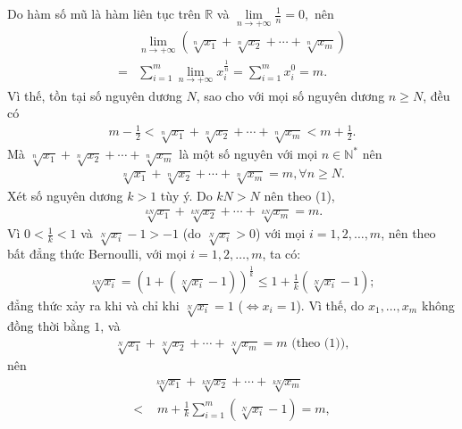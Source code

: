 \begin{multicols}{2}
	\vskip 0.05cm
	Do hàm số mũ là hàm liên tục trên $\mathbb{R}$ và  $\mathop {\lim }\limits_{n \to  + \infty } \frac{1}{n} = 0,$ nên
	\begin{align*}
		&\mathop {\lim }\limits_{n \to  + \infty } \left( {\sqrt[n]{{{x_1}}} + \sqrt[n]{{{x_2}}} +  \cdots  + \sqrt[n]{{{x_m}}}} \right) \\
		= &\sum\limits_{i = 1}^m {\mathop {\lim }\limits_{n \to  + \infty } x_i^{\frac{1}{n}}}  = \sum\limits_{i = 1}^m {x_i^0}  = m.
	\end{align*}
	Vì thế, tồn tại số nguyên dương $N$, sao cho với mọi số nguyên dương $n \ge N$, đều có
	\begin{align*}
		m - \frac{1}{2} < \sqrt[n]{{{x_1}}} + \sqrt[n]{{{x_2}}} +  \cdots  + \sqrt[n]{{{x_m}}} < m + \frac{1}{2}.
	\end{align*}
	Mà  $\sqrt[n]{{{x_1}}} + \sqrt[n]{{{x_2}}} +  \cdots  + \sqrt[n]{{{x_m}}}$ là một số nguyên với mọi $n \in \mathbb{N^*}$  nên
	\begin{align*}
		\sqrt[n]{{{x_1}}} \!+\! \sqrt[n]{{{x_2}}} \!+\!  \cdots  \!+\! \sqrt[n]{{{x_m}}} \!=\! m,\forall n \!\ge\! N. \tag{$1$}
	\end{align*}
	Xét số nguyên dương $k > 1$ tùy ý.
	\vskip 0.05cm
	Do $kN > N$ nên theo ($1$),
	\begin{align*}
		\sqrt[{kN}]{{{x_1}}} + \sqrt[{kN}]{{{x_2}}} +  \cdots  + \sqrt[{kN}]{{{x_m}}} = m. \tag{$2$}
	\end{align*}
	Vì $0 < \frac{1}{k} < 1$  và $\sqrt[N]{{{x_i}}} - 1 >  - 1$  (do  $\sqrt[N]{{{x_i}}} > 0$) với mọi $i = 1, 2, \ldots, m$, nên theo bất đẳng thức Bernoulli, với mọi $i = 1, 2, \ldots, m$, ta có:
	\begin{align*}
		\sqrt[{kN}]{{{x_i}}} \!=\! {\left( {1 \!+\! \left( {\sqrt[N]{{{x_i}}} \!-\! 1} \right)}\right)^{\frac{1}{k}}} \!\le\! 1 \!+\! \frac{1}{k}\left(\! {\sqrt[N]{{{x_i}}} \!-\! 1} \!\right);
	\end{align*}
	đẳng thức xảy ra khi và chỉ khi $\sqrt[N]{{{x_i}}} = 1$ \linebreak($\Leftrightarrow x_i = 1$).
	\vskip 0.05cm
	Vì thế, do  $x_1, \ldots,x_m$   không đồng thời bằng $1$, và
	\begin{align*}
		\sqrt[N]{{{x_1}}} + \sqrt[N]{{{x_2}}} +  \cdots  + \sqrt[N]{{{x_m}}} = m \text{ (theo ($1$))},
	\end{align*}
	nên
	\begin{align*}
		&\sqrt[{kN}]{{{x_1}}} + \sqrt[{kN}]{{{x_2}}} +  \cdots  + \sqrt[{kN}]{{{x_m}}} \\
		< &\,\,m + \frac{1}{k}\sum\limits_{i = 1}^m {\left( {\sqrt[N]{{{x_i}}} - 1} \right)}  = m,

\end{align*}
\end{multicols}
